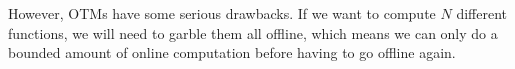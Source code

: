 \documentclass[10pt]{article}
\begin{document}
However, OTMs have some serious drawbacks. If we want to compute $N$ different functions, we will need to garble them all offline, which means we can only do a bounded amount of online computation before having to go offline again.


\nocite{*}


\end{document}
